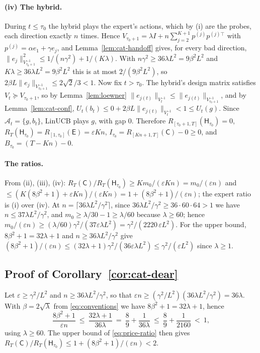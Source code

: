 \documentclass[anon]{alt2027} %
\providecommand{\qed}{\hfill\jmlrBlackBox}
\newcommand{\eps}{\varepsilon}
\newcommand{\Cold}{\mathsf{C}}
\newcommand{\Exp}{\mathsf{E}}
\newcommand{\Hyb}{\mathsf{H}}
\begin{document}
\paragraph{(iv) The hybrid.}
During $t\le\tau_0$ the hybrid plays the expert's actions, which by (i) are
the probes, each direction exactly $n$ times. Hence
$V_{\tau_0+1}=\lambda I+n\sum_{j=2}^{K+1}p^{(j)}p^{(j)\top}$ with $p^{(j)}=\alpha e_1+\gamma e_j$,
and Lemma~\ref{lem:cat-handoff} gives, for every bad direction,
$\|e_j\|^2_{V_{\tau_0+1}^{-1}}\le1/(n\gamma^2)+1/(K\lambda)$. With $n\gamma^2\ge36\lambda L^2=9\beta^2L^2$
and $K\lambda\ge36\lambda L^2=9\beta^2L^2$ this is at most $2/(9\beta^2L^2)$, so
$2\beta L\|e_j\|_{V_{\tau_0+1}^{-1}}\le2\sqrt2/3<1$. Now fix $t>\tau_0$. The
hybrid's design matrix satisfies $V_t\succeq V_{\tau_0+1}$, so by
Lemma~\ref{lem:loewner} $\|e_{j(t)}\|_{V_t^{-1}}\le\|e_{j(t)}\|_{V_{\tau_0+1}^{-1}}$,
and by Lemma~\ref{lem:cat-conf}, $U_t(b_t)\le0+2\beta L\|e_{j(t)}\|_{V_t^{-1}}<1\le U_t(g)$.
Since $\mathcal A_t=\{g,b_t\}$, LinUCB plays $g$, with gap $0$. Therefore
$R_{[\tau_0+1,T]}(\Hyb_{\tau_0})=0$, $R_T(\Hyb_{\tau_0})=R_{[1,\tau_0]}(\Exp)=\eps Kn$,
$I_{\tau_0}=R_{[Kn+1,T]}(\Cold)-0\ge0$, and $B_{\tau_0}=(T-Kn)-0$.

\paragraph{The ratios.}
From (ii), (iii), (iv): $R_T(\Cold)/R_T(\Hyb_{\tau_0})\ge Km_0/(\eps Kn)=m_0/(\eps n)$
and $\le(K(8\beta^2+1)+\eps Kn)/(\eps Kn)=1+(8\beta^2+1)/(\eps n)$; the
expert ratio is (i) over (iv). At $n=\lceil36\lambda L^2/\gamma^2\rceil$, since
$36\lambda L^2/\gamma^2\ge36\cdot60\cdot64>1$ we have $n\le37\lambda L^2/\gamma^2$, and
$m_0\ge\lambda/30-1\ge\lambda/60$ because $\lambda\ge60$; hence
$m_0/(\eps n)\ge(\lambda/60)\gamma^2/(37\eps\lambda L^2)=\gamma^2/(2220\,\eps L^2)$. For the
upper bound, $8\beta^2+1=32\lambda+1$ and $n\ge36\lambda L^2/\gamma^2$ give
$(8\beta^2+1)/(\eps n)\le(32\lambda+1)\gamma^2/(36\eps\lambda L^2)\le \gamma^2/(\eps L^2)$
since $\lambda\ge1$. \qed

\subsection{Proof of Corollary~\ref{cor:cat-dear}}

Let $\eps\ge \gamma^2/L^2$ and $n\ge36\lambda L^2/\gamma^2$, so that
$\eps n\ge(\gamma^2/L^2)(36\lambda L^2/\gamma^2)=36\lambda$. With $\beta=2\sqrt\lambda$
from \eqref{eq:conventions} we have $8\beta^2+1=32\lambda+1$, hence
\[
\frac{8\beta^2+1}{\eps n}\ \le\ \frac{32\lambda+1}{36\lambda}
\ =\ \frac89+\frac{1}{36\lambda}\ \le\ \frac89+\frac{1}{2160}\ <\ 1 ,
\]
using $\lambda\ge60$. The upper bound of \eqref{eq:price-ratio} then gives
$R_T(\Cold)/R_T(\Hyb_{\tau_0})\le1+(8\beta^2+1)/(\eps n)<2$. \qed
\end{document}
